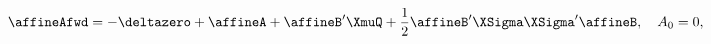 \begin{equation*}
	\affineAfwd = - \deltazero + \affineA + \affineB' \XmuQ + \frac{1}{2} \affineB' \XSigma \XSigma' \affineB , \quad A_{0} = 0 ,
\end{equation*}